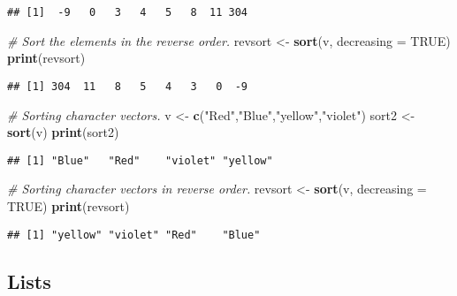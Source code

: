 \documentclass[
]{article}
\newenvironment{Shaded}{\begin{snugshade}}{\end{snugshade}}
\newcommand{\AttributeTok}[1]{\textcolor[rgb]{0.13,0.29,0.53}{#1}}
\newcommand{\CommentTok}[1]{\textcolor[rgb]{0.56,0.35,0.01}{\textit{#1}}}
\newcommand{\ConstantTok}[1]{\textcolor[rgb]{0.56,0.35,0.01}{#1}}
\newcommand{\FunctionTok}[1]{\textcolor[rgb]{0.13,0.29,0.53}{\textbf{#1}}}
\newcommand{\NormalTok}[1]{#1}
\newcommand{\OtherTok}[1]{\textcolor[rgb]{0.56,0.35,0.01}{#1}}
\newcommand{\StringTok}[1]{\textcolor[rgb]{0.31,0.60,0.02}{#1}}
\begin{document}
\begin{verbatim}
## [1]  -9   0   3   4   5   8  11 304
\end{verbatim}

\begin{Shaded}
\begin{Highlighting}[]
\CommentTok{\# Sort the elements in the reverse order.}
\NormalTok{revsort }\OtherTok{\textless{}{-}} \FunctionTok{sort}\NormalTok{(v, }\AttributeTok{decreasing =} \ConstantTok{TRUE}\NormalTok{)}
\FunctionTok{print}\NormalTok{(revsort)}
\end{Highlighting}
\end{Shaded}

\begin{verbatim}
## [1] 304  11   8   5   4   3   0  -9
\end{verbatim}

\begin{Shaded}
\begin{Highlighting}[]
\CommentTok{\# Sorting character vectors.}
\NormalTok{v }\OtherTok{\textless{}{-}} \FunctionTok{c}\NormalTok{(}\StringTok{"Red"}\NormalTok{,}\StringTok{"Blue"}\NormalTok{,}\StringTok{"yellow"}\NormalTok{,}\StringTok{"violet"}\NormalTok{)}
\NormalTok{sort2 }\OtherTok{\textless{}{-}} \FunctionTok{sort}\NormalTok{(v)}
\FunctionTok{print}\NormalTok{(sort2)}
\end{Highlighting}
\end{Shaded}

\begin{verbatim}
## [1] "Blue"   "Red"    "violet" "yellow"
\end{verbatim}

\begin{Shaded}
\begin{Highlighting}[]
\CommentTok{\# Sorting character vectors in reverse order.}
\NormalTok{revsort }\OtherTok{\textless{}{-}} \FunctionTok{sort}\NormalTok{(v, }\AttributeTok{decreasing =} \ConstantTok{TRUE}\NormalTok{)}
\FunctionTok{print}\NormalTok{(revsort)}
\end{Highlighting}
\end{Shaded}

\begin{verbatim}
## [1] "yellow" "violet" "Red"    "Blue"
\end{verbatim}

\hypertarget{lists}{%
\subsection{Lists}\label{lists}}
\end{document}
